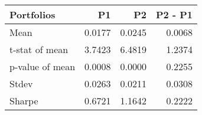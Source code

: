 \begin{tabular}{lrrr}
\toprule
Portfolios & P1 & P2 & P2 - P1 \\
\midrule
Mean & 0.0177 & 0.0245 & 0.0068 \\
t-stat of mean & 3.7423 & 6.4819 & 1.2374 \\
p-value of mean & 0.0008 & 0.0000 & 0.2255 \\
Stdev & 0.0263 & 0.0211 & 0.0308 \\
Sharpe & 0.6721 & 1.1642 & 0.2222 \\
\bottomrule
\end{tabular}
